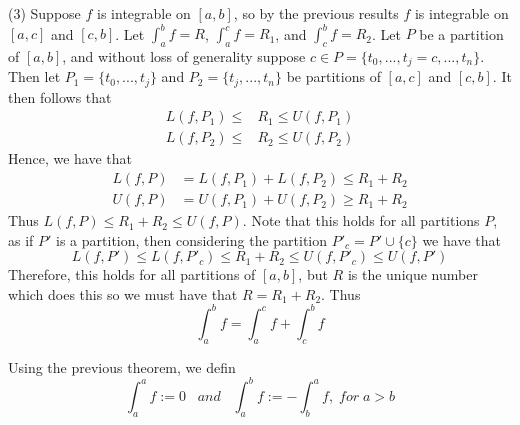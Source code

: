 \documentclass[12pt]{report}
\begin{document}
\begin{proof*}{}{}
    (3) Suppose $f$ is integrable on $[a,b]$, so by the previous results $f$ is integrable on $[a,c]$ and $[c,b]$. Let $\int_a^bf = R$, $\int_a^cf = R_1$, and $\int_c^bf = R_2$. Let $P$ be a partition of $[a,b]$, and without loss of generality suppose $c \in P = \{t_0,...,t_j = c,...,t_n\}$. Then let $P_1 = \{t_0,...,t_j\}$ and $P_2 = \{t_j,...,t_n\}$ be partitions of $[a,c]$ and $[c,b]$. It then follows that \begin{align*}
        L(f,P_1) \leq &R_1 \leq U(f,P_1) \\
        L(f,P_2) \leq &R_2 \leq U(f,P_2)
    \end{align*}
    Hence, we have that \begin{align*}
        L(f,P) &= L(f,P_1) + L(f,P_2) \leq R_1 + R_2 \\
        U(f,P) &= U(f,P_1) + U(f,P_2) \geq R_1 + R_2
    \end{align*}
    Thus $L(f,P) \leq R_1 + R_2\leq U(f,P)$. Note that this holds for all partitions $P$, as if $P'$ is a partition, then considering the partition $P'_{c} = P' \cup \{c\}$ we have that $$L(f,P') \leq L(f,P'_{c}) \leq R_1 + R_2 \leq U(f,P'_{c}) \leq U(f,P')$$
    Therefore, this holds for all partitions of $[a,b]$, but $R$ is the unique number which does this so we must have that $R = R_1 + R_2$. Thus \begin{equation*}
        \int_a^bf = \int_a^cf + \int_c^bf
    \end{equation*}
\end{proof*}


\begin{defn}{}{}
    Using the previous theorem, we defin \begin{equation}
        \int_a^af := 0 \;\;\;and\;\;\;\int_a^bf := -\int_b^af,\;for\;a>b
    \end{equation}
\end{defn}
\end{document}

